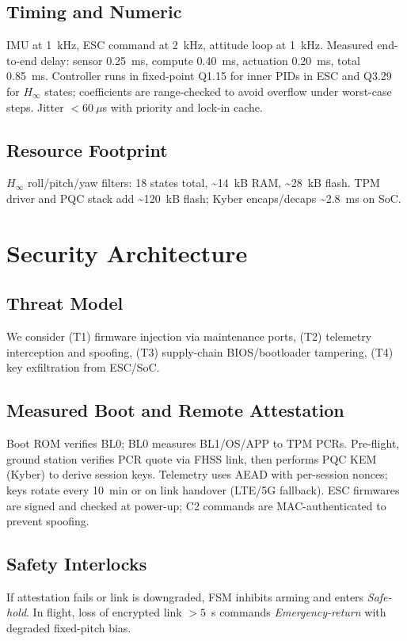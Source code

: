 \documentclass[conference]{IEEEtran}
\begin{document}
\subsection{Timing and Numeric}
IMU at 1~kHz, ESC command at 2~kHz, attitude loop at 1~kHz. Measured end-to-end delay: sensor \SI{0.25}{ms}, compute \SI{0.40}{ms}, actuation \SI{0.20}{ms}, total \SI{0.85}{ms}. Controller runs in fixed-point Q1.15 for inner PIDs in ESC and Q3.29 for $H_\infty$ states; coefficients are range-checked to avoid overflow under worst-case steps. Jitter $<\!60~\mu$s with priority and lock-in cache.

\subsection{Resource Footprint}
$H_\infty$ roll/pitch/yaw filters: 18 states total, \textasciitilde14~kB RAM, \textasciitilde28~kB flash. TPM driver and PQC stack add \textasciitilde120~kB flash; Kyber encaps/decaps \textasciitilde2.8~ms on SoC.

\section{Security Architecture}
\subsection{Threat Model}
We consider (T1) firmware injection via maintenance ports, (T2) telemetry interception and spoofing, (T3) supply-chain BIOS/bootloader tampering, (T4) key exfiltration from ESC/SoC.

\subsection{Measured Boot and Remote Attestation}
Boot ROM verifies BL0; BL0 measures BL1/OS/APP to TPM PCRs. Pre-flight, ground station verifies PCR quote via FHSS link, then performs PQC KEM (Kyber) to derive session keys. Telemetry uses AEAD with per-session nonces; keys rotate every 10~min or on link handover (LTE/5G fallback). ESC firmwares are signed and checked at power-up; C2 commands are MAC-authenticated to prevent spoofing.

\subsection{Safety Interlocks}
If attestation fails or link is downgraded, FSM inhibits arming and enters \emph{Safe-hold}. In flight, loss of encrypted link $>5$~s commands \emph{Emergency-return} with degraded fixed-pitch bias.
\end{document}

